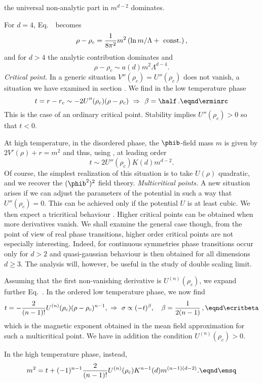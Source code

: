 the universal non-analytic part in $m^{d-2}$ dominates.\par
For $d=4$, Eq.~\edmum\ becomes
$$\rho-\rho_c=\frac{1}{8\pi^2} m^2\left(\ln m/\Lambda+\ {\rm const.}\right),$$
and for $d>4$ the analytic contribution dominates and
$$\rho-\rho_c\sim a(d)m^2\Lambda^{d-4}.$$
\medskip
{\it Critical point.} In a generic situation $V''(\rho_c)=U''(\rho_c)$ does
not vanish, a situation we have examined in section \ssNUfige. We  find in the low temperature phase
$$t=r-r_c\sim -2 U''(\rho_c)(\rho-\rho_c) \ \Rightarrow\ \beta=\half\,.
\eqnd\erminrc$$
This is the case of an ordinary critical point. Stability implies
$U''(\rho_c)>0$ so that $t<0$.\par
At high temperature, in the disordered phase, the $\phib$-field mass $m$ is
given by $2V'(\rho)+ r=m^2$ and thus, using \edmum, at leading order
$$t\sim 2U''(\rho_c)K(d)m^{d-2}.$$
Of course, the
simplest realization of this situation is to take $U(\rho)$ quadratic, and we
recover the $(\phib^2)^2$ field theory.
\medskip
{\it Multicritical points.} A new situation arises if we can
adjust the parameters of the potential in such a way that
$U''(\rho_c)=0$. This can be achieved only if the potential $U$ is
at least cubic. We then expect a tricritical behaviour \rNtricrit.
Higher critical points can be obtained when more derivatives
vanish. We shall examine the general case though, from the point
of view of real phase transitions, higher order critical points
are not especially interesting. Indeed, for continuous symmetries
phase transitions occur only for $d>2$ and quasi-gaussian
behaviour is then obtained for all dimensions $d\ge 3$. The
analysis will, however, be useful in the study of  double scaling
limit. \par
Assuming that the first non-vanishing derivative is
$U^{(n)}(\rho_c)$, we expand further Eq.~. In the
ordered low temperature phase, we now find
$$t=-{2\over (n-1)!}U^{(n)}(\rho_c)(\rho-\rho_c)^{n-1},\ \Rightarrow\
\sigma\propto (-t)^\beta,\quad \beta={1\over2(n-1)}\,  ,  \eqnd\ecritbeta $$
which is the magnetic exponent  obtained in the mean field approximation for such a multicritical point.
We have in addition the condition $U^{(n)}(\rho_c)>0$.\par
In the high temperature phase, instead,
$$m^2=t+ (-1)^{n-1}{2\over (n-1)!}U^{(n)}(\rho_c)K^{n-1}(d)m^{(n-1)(d-2)}.
\eqnd\emsq$$
